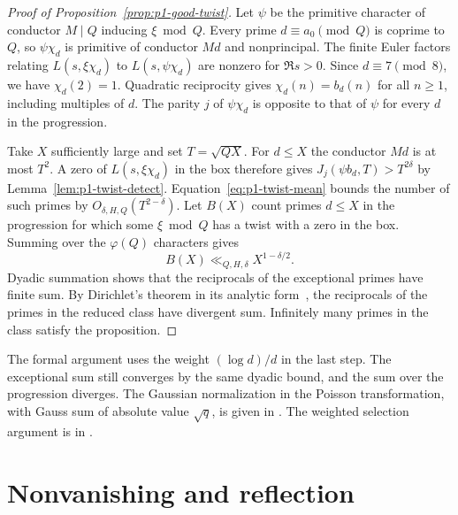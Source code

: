 \begin{proof}[Proof of Proposition~\ref{prop:p1-good-twist}]
Let $\psi$ be the primitive character of conductor $M\mid Q$ inducing
$\xi\bmod Q$. Every prime $d\equiv a_0\pmod Q$ is coprime to $Q$,
so $\psi\chi_d$ is primitive of conductor $Md$ and nonprincipal. The
finite Euler factors relating $L(s,\xi\chi_d)$ to $L(s,\psi\chi_d)$
are nonzero for $\Re s>0$. Since $d\equiv7\pmod8$, we have
$\chi_d(2)=1$. Quadratic reciprocity gives $\chi_d(n)=b_d(n)$ for
all $n\ge1$, including multiples of $d$. The parity $j$ of $\psi\chi_d$
is opposite to that of $\psi$ for every $d$ in the progression.

Take $X$ sufficiently large and set $T=\sqrt{QX}$. For $d\le X$ the
conductor $Md$ is at most $T^2$. A zero of $L(s,\xi\chi_d)$ in the box
therefore gives $J_j(\psi b_d,T)>T^{2\delta}$ by
Lemma~\ref{lem:p1-twist-detect}. Equation~\eqref{eq:p1-twist-mean}
bounds the number of such primes by $O_{\delta,H,Q}(T^{2-\delta})$.
Let $B(X)$ count primes $d\le X$ in the progression for which some
$\xi\bmod Q$ has a twist with a zero in the box. Summing over the
$\varphi(Q)$ characters gives
\[
 B(X)\ll_{Q,H,\delta} X^{1-\delta/2}.
\]
Dyadic summation shows that the reciprocals of the exceptional primes
have finite sum. By Dirichlet's theorem in its analytic form~\cite[Chapter~4]{MV}, the
reciprocals of the primes in the reduced class have divergent sum.
Infinitely many primes in the class satisfy the proposition.
\end{proof}

The formal argument uses the weight $(\log d)/d$ in the last step.
The exceptional sum still converges by the same dyadic bound, and the
sum over the progression diverges. The Gaussian normalization in the
Poisson transformation, with Gauss sum of absolute value $\sqrt q$,
is given in .
The weighted selection argument is in
.

\section{Nonvanishing and reflection}\label{sec:descent}
